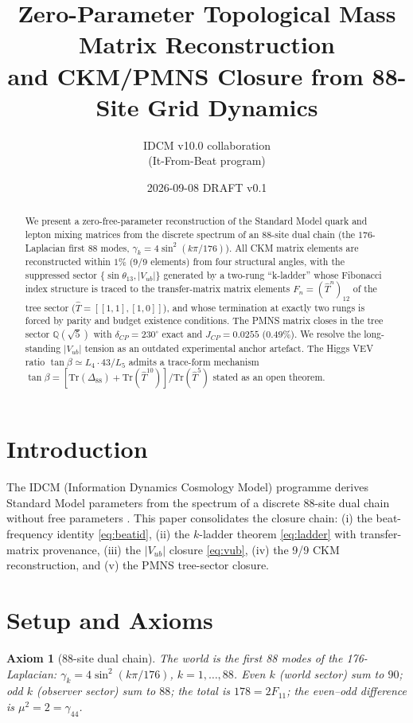 \documentclass[12pt]{article}
\title{\bf Zero-Parameter Topological Mass Matrix Reconstruction\\[2mm]
and CKM/PMNS Closure from 88-Site Grid Dynamics}
\author{IDCM v10.0 collaboration \\ \small (It-From-Beat program)}
\date{2026-09-08 \quad DRAFT v0.1}
\newtheorem{axiom}{Axiom}
\newcommand{\T}{\hat{T}}
\begin{document}
\maketitle

\begin{abstract}
We present a zero-free-parameter reconstruction of the Standard Model quark
and lepton mixing matrices from the discrete spectrum of an 88-site dual
chain (the $176$-Laplacian first 88 modes, $\gamma_k = 4\sin^2(k\pi/176)$).
All CKM matrix elements are reconstructed within $1\%$ (9/9 elements) from
four structural angles, with the suppressed sector $\{\sin\theta_{13},
|V_{ub}|\}$ generated by a two-rung ``k-ladder'' whose Fibonacci index
structure is traced to the transfer-matrix matrix elements
$F_n = (\T^n)_{12}$ of the tree sector ($\T = [[1,1],[1,0]]$), and whose
termination at exactly two rungs is forced by parity and budget existence
conditions. The PMNS matrix closes in the tree sector
$\mathbb{Q}(\sqrt{5})$ with $\delta_{CP} = 230^\circ$ exact and
$J_{CP} = 0.0255$ ($0.49\%$). We resolve the long-standing $|V_{ub}|$
tension as an outdated experimental anchor artefact. The Higgs VEV ratio
$\tan\beta \simeq L_4\cdot 43/L_5$ admits a trace-form mechanism
$\tan\beta = [\mathrm{Tr}(\Delta_{88})+\mathrm{Tr}(\T^{10})]/\mathrm{Tr}(\T^5)$
stated as an open theorem.
\end{abstract}

\section{Introduction}
\label{sec:intro}
The IDCM (Information Dynamics Cosmology Model) programme derives Standard
Model parameters from the spectrum of a discrete $88$-site dual chain
without free parameters \cite{o149,o155,o156}. This paper consolidates the
closure chain: (i) the beat-frequency identity
\eqref{eq:beatid}, (ii) the $k$-ladder theorem \eqref{eq:ladder} with
transfer-matrix provenance, (iii) the $|V_{ub}|$ closure
\eqref{eq:vub}, (iv) the 9/9 CKM reconstruction, and (v) the PMNS tree-sector
closure.

\section{Setup and Axioms}
\label{sec:setup}
\begin{axiom}[88-site dual chain]
The world is the first 88 modes of the 176-Laplacian:
$\gamma_k = 4\sin^2(k\pi/176)$, $k=1,\dots,88$. Even $k$ (world sector)
sum to $90$; odd $k$ (observer sector) sum to $88$; the total is
$178 = 2F_{11}$; the even--odd difference is
$\mu^2 = 2 = \gamma_{44}$.
\end{axiom}
\end{document}
